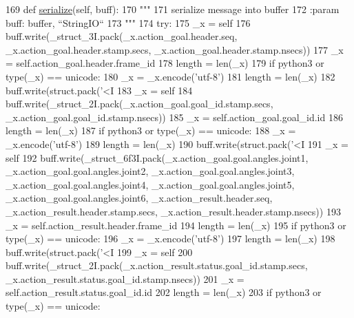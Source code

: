 \begin{DoxyCode}
169   \textcolor{keyword}{def }\hyperlink{classjaco__msgs_1_1msg_1_1__ArmJointAnglesAction_1_1ArmJointAnglesAction_a037ec8c60926016d9d4b3cdaeac113c3}{serialize}(self, buff):
170     \textcolor{stringliteral}{"""}
171 \textcolor{stringliteral}{    serialize message into buffer}
172 \textcolor{stringliteral}{    :param buff: buffer, ``StringIO``}
173 \textcolor{stringliteral}{    """}
174     \textcolor{keywordflow}{try}:
175       \_x = self
176       buff.write(\_struct\_3I.pack(\_x.action\_goal.header.seq, \_x.action\_goal.header.stamp.secs, 
      \_x.action\_goal.header.stamp.nsecs))
177       \_x = self.action\_goal.header.frame\_id
178       length = len(\_x)
179       \textcolor{keywordflow}{if} python3 \textcolor{keywordflow}{or} type(\_x) == unicode:
180         \_x = \_x.encode(\textcolor{stringliteral}{'utf-8'})
181         length = len(\_x)
182       buff.write(struct.pack(\textcolor{stringliteral}{'<I%
183       \_x = self
184       buff.write(\_struct\_2I.pack(\_x.action\_goal.goal\_id.stamp.secs, \_x.action\_goal.goal\_id.stamp.nsecs))
185       \_x = self.action\_goal.goal\_id.id
186       length = len(\_x)
187       \textcolor{keywordflow}{if} python3 \textcolor{keywordflow}{or} type(\_x) == unicode:
188         \_x = \_x.encode(\textcolor{stringliteral}{'utf-8'})
189         length = len(\_x)
190       buff.write(struct.pack(\textcolor{stringliteral}{'<I%
191       \_x = self
192       buff.write(\_struct\_6f3I.pack(\_x.action\_goal.goal.angles.joint1, \_x.action\_goal.goal.angles.joint2, 
      \_x.action\_goal.goal.angles.joint3, \_x.action\_goal.goal.angles.joint4, \_x.action\_goal.goal.angles.joint5, 
      \_x.action\_goal.goal.angles.joint6, \_x.action\_result.header.seq, \_x.action\_result.header.stamp.secs, 
      \_x.action\_result.header.stamp.nsecs))
193       \_x = self.action\_result.header.frame\_id
194       length = len(\_x)
195       \textcolor{keywordflow}{if} python3 \textcolor{keywordflow}{or} type(\_x) == unicode:
196         \_x = \_x.encode(\textcolor{stringliteral}{'utf-8'})
197         length = len(\_x)
198       buff.write(struct.pack(\textcolor{stringliteral}{'<I%
199       \_x = self
200       buff.write(\_struct\_2I.pack(\_x.action\_result.status.goal\_id.stamp.secs, 
      \_x.action\_result.status.goal\_id.stamp.nsecs))
201       \_x = self.action\_result.status.goal\_id.id
202       length = len(\_x)
203       \textcolor{keywordflow}{if} python3 \textcolor{keywordflow}{or} type(\_x) == unicode:
}}}
\end{DoxyCode}
